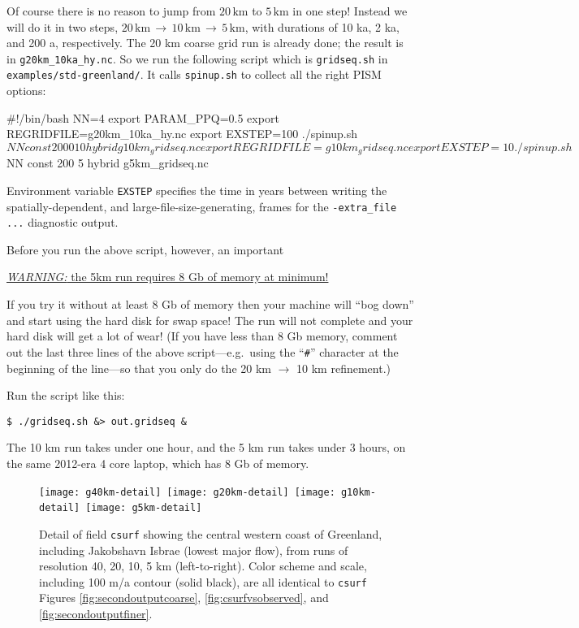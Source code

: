 Of course there is no reason to jump from $20\,\text{km}$ to $5\,\text{km}$ in one step!  Instead we will do it in two steps, $20\,\text{km}\,\to\,10\,\text{km}\,\to\,5\,\text{km}$, with durations of 10 ka, 2 ka, and 200 a, respectively.  The 20 km coarse grid run is already done; the result is in \texttt{g20km_10ka_hy.nc}.  So we run the following script which is \texttt{gridseq.sh} in \texttt{examples/std-greenland/}.  It calls \texttt{spinup.sh} to collect all the right PISM options:
\begin{scriptvrb}
#!/bin/bash
NN=4
export PARAM_PPQ=0.5
export REGRIDFILE=g20km_10ka_hy.nc
export EXSTEP=100
./spinup.sh $NN const 2000  10 hybrid g10km_gridseq.nc
export REGRIDFILE=g10km_gridseq.nc
export EXSTEP=10
./spinup.sh $NN const 200    5 hybrid  g5km_gridseq.nc
\end{scriptvrb}
Environment variable \verb|EXSTEP| specifies the time in years between writing the spatially-dependent, and large-file-size-generating, frames for the \verb|-extra_file ...| diagnostic output.

Before you run the above script, however, an important

\medskip
\centerline{\large\underline{\emph{WARNING:} the 5km run requires 8 Gb of memory at minimum!}\normalsize}

\medskip
\noindent If you try it without at least 8 Gb of memory then your machine will ``bog down'' and start using the hard disk for swap space!  The run will not complete and your hard disk will get a lot of wear!  (If you have less than 8 Gb memory, comment out the last three lines of the above script---e.g.~using the ``\verb|#|'' character at the beginning of the line---so that you only do the 20 km $\to$ 10 km refinement.)

Run the script like this:
\begin{verbatim}
$ ./gridseq.sh &> out.gridseq &
\end{verbatim}
The 10 km run takes under one hour, and the 5 km run takes under 3 hours, on the same 2012-era 4 core laptop, which has 8 Gb of memory.

\begin{figure}[ht]
\centering
\mbox{\texttt{[image: g40km-detail]} \texttt{[image: g20km-detail]} \texttt{[image: g10km-detail]} \texttt{[image: g5km-detail]} }
\caption{Detail of field \texttt{csurf} showing the central western coast of Greenland, including Jakobshavn Isbrae (lowest major flow), from runs of resolution 40, 20, 10, 5 km (left-to-right).  Color scheme and scale, including 100 m/a contour (solid black), are all identical to \texttt{csurf} Figures \ref{fig:secondoutputcoarse}, \ref{fig:csurfvsobserved}, and \ref{fig:secondoutputfiner}.}
\label{fig:gridseqdetail}
\end{figure}

